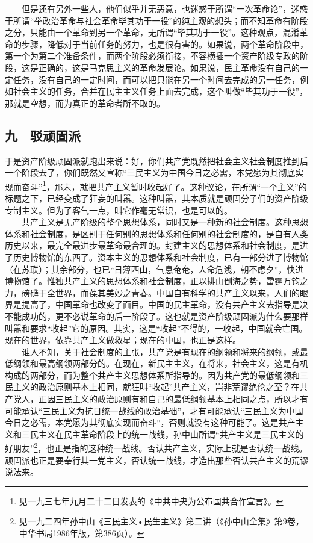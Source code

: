 \documentclass[cn,11pt,chinese]{elegantbook}
\def\myformat#1{\hfil\hfil #1}
\begin{document}
　　但是还有另外一些人，他们似乎并无恶意，也迷惑于所谓“一次革命论”，迷惑于所谓“举政治革命与社会革命毕其功于一役”的纯主观的想头；而不知革命有阶段之分，只能由一个革命到另一个革命，无所谓“毕其功于一役”。这种观点，混淆革命的步骤，降低对于当前任务的努力，也是很有害的。如果说，两个革命阶段中，第一个为第二个准备条件，而两个阶段必须衔接，不容横插一个资产阶级专政的阶段，这是正确的，这是马克思主义的革命发展论。如果说，民主革命没有自己的一定任务，没有自己的一定时间，而可以把只能在另一个时间去完成的另一任务，例如社会主义的任务，合并在民主主义任务上面去完成，这个叫做“毕其功于一役”，那就是空想，而为真正的革命者所不取的。\\
\subsection*{\myformat{九　驳顽固派}}
于是资产阶级顽固派就跑出来说：好，你们共产党既然把社会主义社会制度推到后一个阶段去了，你们既然又宣称“三民主义为中国今日之必需，本党愿为其彻底实现而奋斗”\footnote[20]{ 见一九三七年九月二十二日发表的《中共中央为公布国共合作宣言》。}，那末，就把共产主义暂时收起好了。这种议论，在所谓“一个主义”的标题之下，已经变成了狂妄的叫嚣。这种叫嚣，其本质就是顽固分子们的资产阶级专制主义。但为了客气一点，叫它作毫无常识，也是可以的。\\
　　共产主义是无产阶级的整个思想体系，同时又是一种新的社会制度。这种思想体系和社会制度，是区别于任何别的思想体系和任何别的社会制度的，是自有人类历史以来，最完全最进步最革命最合理的。封建主义的思想体系和社会制度，是进了历史博物馆的东西了。资本主义的思想体系和社会制度，已有一部分进了博物馆（在苏联）；其余部分，也已“日薄西山，气息奄奄，人命危浅，朝不虑夕”，快进博物馆了。惟独共产主义的思想体系和社会制度，正以排山倒海之势，雷霆万钧之力，磅礴于全世界，而葆其美妙之青春。中国自有科学的共产主义以来，人们的眼界是提高了，中国革命也改变了面目。中国的民主革命，没有共产主义去指导是决不能成功的，更不必说革命的后一阶段了。这也就是资产阶级顽固派为什么要那样叫嚣和要求“收起”它的原因。其实，这是“收起”不得的，一收起，中国就会亡国。现在的世界，依靠共产主义做救星；现在的中国，也正是这样。\\
　　谁人不知，关于社会制度的主张，共产党是有现在的纲领和将来的纲领，或最低纲领和最高纲领两部分的。在现在，新民主主义，在将来，社会主义，这是有机构成的两部分，而为整个共产主义思想体系所指导的。因为共产党的最低纲领和三民主义的政治原则基本上相同，就狂叫“收起”共产主义，岂非荒谬绝伦之至？在共产党人，正因三民主义的政治原则有和自己的最低纲领基本上相同之点，所以才有可能承认“三民主义为抗日统一战线的政治基础”，才有可能承认“三民主义为中国今日之必需，本党愿为其彻底实现而奋斗”，否则就没有这种可能了。这是共产主义和三民主义在民主革命阶段上的统一战线，孙中山所谓“共产主义是三民主义的好朋友”\footnote[21]{ 见一九二四年孙中山《三民主义•民生主义》第二讲（《孙中山全集》第9卷，中华书局1986年版，第386页）。}，也正是指的这种统一战线。否认共产主义，实际上就是否认统一战线。顽固派也正是要奉行其一党主义，否认统一战线，才造出那些否认共产主义的荒谬说法来。\\
\end{document}
